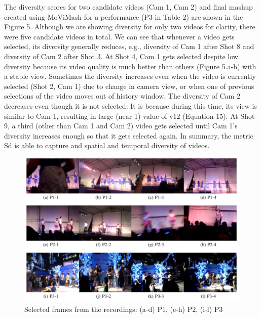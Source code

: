 \documentclass{sig-alternate}
\begin{document}
      The diversity scores for two candidate videos (Cam 1, Cam 2) and final mashup created using MoViMash for a performance (P3 in Table 2) are shown in the Figure 5. Although we are showing diversity for only two videos for clarity, there were five candidate videos in total. We can see that whenever a video gets selected, its diversity generally reduces, e.g., diversity of Cam 1 after Shot 8 and diversity of Cam 2 after Shot 3. At Shot 4, Cam 1 gets selected despite low diversity because its video quality is much better than others (Figure 5.a-b) with a stable view. Sometimes the diversity increases even when the video is currently selected (Shot 2, Cam 1) due to change in camera view, or when one of previous selections of the video moves out of history window. The diversity of Cam 2 decreases even though it is not selected. It is because during this time, its view is similar to Cam 1, resulting in large (near 1) value of v12 (Equation 15). At Shot 9, a third (other than Cam 1 and Cam 2) video gets selected until Cam 1’s diversity increases enough so that it gets selected again. In summary, the metric Sd is able to capture and spatial and temporal diversity of videos.
    \begin{figure}[h]
    \centering
    \includegraphics[width=01\textwidth]{img6.png}
    \caption{Selected frames from the recordings: (a-d) P1, (e-h) P2, (i-l) P3}
    \label{fig:mesh6}
\end{figure}
      
    
\end{document}
